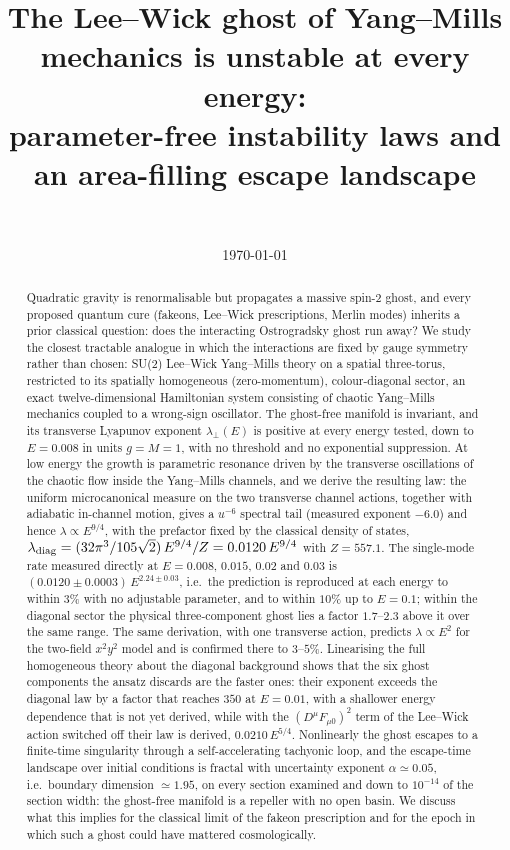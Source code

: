 \documentclass[11pt,a4paper]{article}
\title{The Lee--Wick ghost of Yang--Mills mechanics is unstable at every energy:\\
parameter-free instability laws and an area-filling escape landscape}
\author{\AuthorName\\ \small \texttt{\AuthorEmail}}
\date{\today}
\begin{document}
\maketitle

\begin{abstract}
Quadratic gravity is renormalisable but propagates a massive spin-2 ghost, and every proposed
quantum cure (fakeons, Lee--Wick prescriptions, Merlin modes) inherits a prior classical question:
does the interacting Ostrogradsky ghost run away? We study the closest tractable analogue in which
the interactions are fixed by gauge symmetry rather than chosen: SU(2) Lee--Wick Yang--Mills theory
on a spatial three-torus, restricted to its spatially homogeneous (zero-momentum), colour-diagonal
sector, an exact twelve-dimensional Hamiltonian system consisting of chaotic Yang--Mills mechanics coupled to a wrong-sign oscillator.
The ghost-free manifold is invariant, and its transverse Lyapunov exponent $\lambda_\perp(E)$ is
positive at every energy tested, down to $E=0.008$ in units $g=M=1$, with no threshold and no
exponential suppression. At low energy the growth is parametric resonance driven by the
transverse oscillations of the chaotic flow inside the Yang--Mills channels, and we derive the
resulting law: the uniform microcanonical measure on the two transverse channel actions, together
with adiabatic in-channel motion, gives a $u^{-6}$ spectral tail (measured exponent $-6.0$) and
hence $\lambda\propto E^{9/4}$, with the prefactor fixed by the classical density of states,
$\lambda_{\rm diag}=(32\pi^3/105\sqrt2)\,E^{9/4}/Z=0.0120\,E^{9/4}$ with $Z=557.1$. The
single-mode rate measured directly at $E=0.008$, $0.015$, $0.02$ and $0.03$ is
$(0.0120\pm0.0003)\,E^{2.24\pm0.03}$, i.e.\ the prediction is reproduced at each energy to
within $3\%$ with no adjustable parameter, and to within $10\%$ up to $E=0.1$; within the diagonal
sector the physical three-component ghost lies a factor $1.7$--$2.3$ above it over the same range.
The same derivation, with one transverse action, predicts $\lambda\propto E^2$ for the two-field
$x^2y^2$ model and is confirmed there to $3$--$5\%$. Linearising the full homogeneous theory about
the diagonal background shows that the six ghost components the ansatz discards are the faster
ones: their exponent exceeds the diagonal law by a factor that reaches $350$ at $E=0.01$, with a
shallower energy dependence that is not yet derived, while with the $(D^\mu F_{\mu0})^2$ term of
the Lee--Wick action switched off their law is derived, $0.0210\,E^{5/4}$. Nonlinearly the ghost escapes to a
finite-time singularity through a self-accelerating tachyonic loop, and the escape-time landscape
over initial conditions is fractal with uncertainty exponent $\alpha\simeq0.05$, i.e.\ boundary
dimension $\simeq1.95$, on every section examined and down to $10^{-14}$ of the section width:
the ghost-free manifold is a repeller with no open basin. We discuss what this implies for the
classical limit of the fakeon prescription and for the epoch in which such a ghost could have
mattered cosmologically.
\end{abstract}
\end{document}
